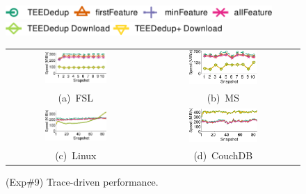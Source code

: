 \begin{figure}[!htb]
    \centering
    \includegraphics[height=0.2in]{pic/featurespy/plot/performance/LANTrace/trace_legend_upload.pdf}\\
    \includegraphics[height=0.2in]{pic/featurespy/plot/performance/LANTrace/trace_legend_download.pdf}\\
    \vspace{3pt}
    \begin{tabular}{@{\ }c@{\ }c}
        \includegraphics[width=0.47\textwidth]{pic/featurespy/plot/performance/LANTrace/trace_fsl.pdf}&
        \includegraphics[width=0.47\textwidth]{pic/featurespy/plot/performance/LANTrace/trace_ms.pdf}\\
        \mbox{\small (a) FSL} &
        \mbox{\small (b) MS}\\
        \includegraphics[width=0.47\textwidth]{pic/featurespy/plot/performance/LANTrace/trace_linux.pdf}&
        \includegraphics[width=0.47\textwidth]{pic/featurespy/plot/performance/LANTrace/trace_couch.pdf}\\
        \mbox{\small (c) Linux} &
        \mbox{\small (d) CouchDB}\\
    \end{tabular}
    \caption{(Exp\#9) Trace-driven performance.}
    \label{fig:featurespy-traceDrivenThroughput}
\end{figure}
